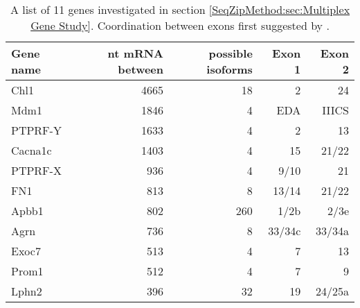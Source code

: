\begin{table}[h]\small
  \begin{tabular}{|l|r|r|r|r|}

  \hline
  \textbf{Gene name} & \textbf{nt mRNA between} & \textbf{possible isoforms} & \textbf{Exon 1} & \textbf{Exon 2} \\ \hline
  Chl1               & 4665                              & 18                         & 2               & 24              \\ \hline
  Mdm1               & 1846                              & 4                          & EDA             & IIICS           \\ \hline
  PTPRF-Y            & 1633                              & 4                          & 2               & 13              \\ \hline
  Cacna1c            & 1403                              & 4                          & 15              & 21/22           \\ \hline
  PTPRF-X            & 936                               & 4                          & 9/10            & 21              \\ \hline
  FN1                & 813                               & 8                          & 13/14           & 21/22           \\ \hline
  Apbb1              & 802                               & 260                        & 1/2b            & 2/3e            \\ \hline
  Agrn               & 736                               & 8                          & 33/34c          & 33/34a          \\ \hline
  Exoc7              & 513                               & 4                          & 7               & 13              \\ \hline
  Prom1              & 512                               & 4                          & 7               & 9               \\ \hline
  Lphn2              & 396                               & 32                         & 19              & 24/25a          \\ \hline
  \end{tabular}
    \caption[Mouse genes with large sequence between suggested coordinated cassette exons]
    {
      A list of 11 genes investigated in section \ref{SeqZipMethod:sec:Multiplex Gene Study}. Coordination between exons first suggested by \citep{Fagnani2007}.
      }
    \label{table: BigSpanGenes}
  \end{table}
